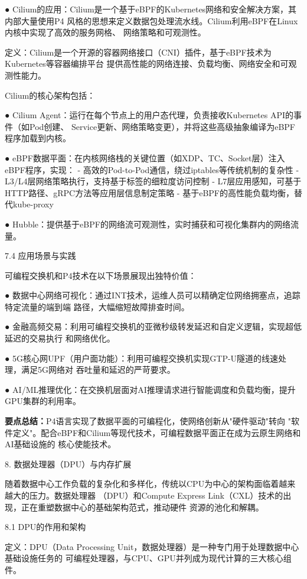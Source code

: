 ● Cilium的应用：Cilium是一个基于eBPF的Kubernetes网络和安全解决方案，其内部大量使用P4
  风格的思想来定义数据包处理流水线。Cilium利用eBPF在Linux内核中实现了高效的服务网格、
  网络策略和可观测性。
  
定义：Cilium是一个开源的容器网络接口（CNI）插件，基于eBPF技术为Kubernetes等容器编排平台
提供高性能的网络连接、负载均衡、网络安全和可观测性能力。

Cilium的核心架构包括：

● Cilium Agent：运行在每个节点上的用户态代理，负责接收Kubernetes API的事件（如Pod创建、
  Service更新、网络策略变更），并将这些高级抽象编译为eBPF程序加载到内核。
  
● eBPF数据平面：在内核网络栈的关键位置（如XDP、TC、Socket层）注入eBPF程序，实现：
  - 高效的Pod-to-Pod通信，绕过iptables等传统机制的复杂性
  - L3/L4层网络策略执行，支持基于标签的细粒度访问控制
  - L7层应用感知，可基于HTTP路径、gRPC方法等应用层信息制定策略
  - 基于eBPF的高性能负载均衡，替代kube-proxy
  
● Hubble：提供基于eBPF的网络流可观测性，实时捕获和可视化集群内的网络流量。

7.4  应用场景与实践

可编程交换机和P4技术在以下场景展现出独特价值：

● 数据中心网络可视化：通过INT技术，运维人员可以精确定位网络拥塞点，追踪特定流量的端到端
  路径，大幅缩短故障排查时间。
  
● 金融高频交易：利用可编程交换机的亚微秒级转发延迟和自定义逻辑，实现超低延迟的交易执行
  和网络优化。
  
● 5G核心网UPF（用户面功能）：利用可编程交换机实现GTP-U隧道的线速处理，满足5G网络对
  吞吐量和延迟的严苛要求。
  
● AI/ML推理优化：在交换机层面对AI推理请求进行智能调度和负载均衡，提升GPU集群的利用率。

\vspace{0.5em}
\noindent\textbf{要点总结：}P4语言实现了数据平面的可编程化，使网络创新从"硬件驱动"转向
"软件定义"。配合eBPF和Cilium等现代技术，可编程数据平面正在成为云原生网络和AI基础设施的
核心使能技术。


8.  数据处理器（DPU）与内存扩展

随着数据中心工作负载的复杂化和多样化，传统以CPU为中心的架构面临着越来越大的压力。数据处理器
（DPU）和Compute Express Link（CXL）技术的出现，正在重塑数据中心的基础架构范式，推动硬件
资源的池化和解耦。

8.1  DPU的作用和架构

定义：DPU（Data Processing Unit，数据处理器）是一种专门用于处理数据中心基础设施任务的
可编程处理器，与CPU、GPU并列成为现代计算的三大核心组件。

